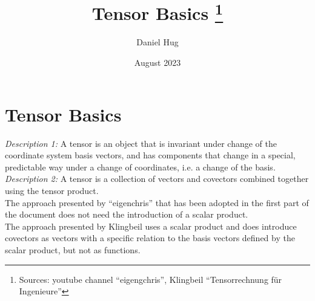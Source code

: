 \documentclass[12pt,oneside,a4paper]{article}
\title{Tensor Basics \footnote{Sources: youtube channel ``eigengchris'', Klingbeil
``Tensorrechnung für Ingenieure''}}
\author{Daniel Hug}
\date{August 2023}
\begin{document}
\maketitle


\setlength{\parindent}{0pt}

\section{Tensor Basics}

\emph{Description 1:} A tensor is an object that is invariant under change of the
coordinate system basis vectors, and has components that change in a special, predictable
way under a change of coordinates, i.e. a change of the basis. \\

\emph{Description 2:} A tensor is a collection of vectors and covectors combined together
using the tensor product.\\

The approach presented by ``eigenchris'' that has been adopted in the first part of the
document does not need the introduction of a scalar product.\\

The approach presented by Klingbeil uses a scalar product and does introduce covectors as
vectors with a specific relation to the basis vectors defined by the scalar product, but
not as functions.

\newpage






\end{document}
